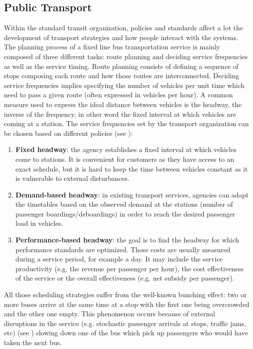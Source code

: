 \documentclass[12pt,a4paper]{article}
\begin{document}
\subsection{Public Transport}\label{pubtrans}
Within the standard transit organization, policies and standards affect a lot the development of transport strategies and how people interact with the systems. The planning process of a fixed line bus transportation service is mainly composed of three different tasks: route planning and deciding service frequencies as well as the service timing. Route planning consists of defining a sequence of stops composing each route and how those routes are interconnected. Deciding service frequencies implies specifying the number of vehicles per unit time which need to pass a given route (often expressed in vehicles per hour). A common measure used to express the ideal distance between vehicles is the headway, the inverse of the frequency, in other word the fixed interval at which vehicles are coming at a station. The service frequencies set by the transport organization can be chosen based on different policies (see \cite{tcrp}): 
\begin{enumerate}
\item \textbf{Fixed headway}: the agency establishes a fixed interval at which vehicles come to stations. It is convenient for customers as they have access to an exact schedule, but it is hard to keep the time between vehicles constant as it is vulnerable to external disturbances.
\item \textbf{Demand-based headway}: in existing transport services, agencies can adapt the timetables based on the observed demand at the stations (number of passenger boardings/deboardings) in order to reach the desired passenger load in vehicles.
\item \textbf{Performance-based headway}: the goal is to find the headway for which performance standards are optimized. Those costs are usually measured during a service period, for example a day. It may include the service productivity (e.g. the revenue per passenger per hour), the cost effectiveness of the service or the overall effectiveness (e.g. net subsidy per passenger). 
\end{enumerate}

All those scheduling strategies suffer from the well-known bunching effect: two or more buses arrive at the same time at a stop with the first one being overcrowded and the other one empty. This phenomenon occurs because of external disruptions in the service (e.g. stochastic passenger arrivals at stops, traffic jams, etc) (see \cite{hwadherence}) slowing down one of the bus which pick up passengers who would have taken the next bus. 
\end{document}
